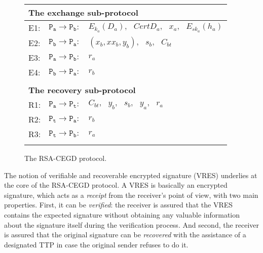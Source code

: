 \documentclass{article}
\begin{document}
\begin{figure}[t]
\begin{center}
\begin{tabular}[3]{lll}


\hline

\hline

\multicolumn{3}{l}{\textbf{The exchange sub-protocol}}\\

\hline

E1: & $\mathtt{P_a} \rightarrow \mathtt{P_b}:$ & $E_{k_a}(D_a),
\mbox{ } CertD_a, \mbox{ } x_a, \mbox{ } E_{sk_a}(h_a)$ \\

E2: & $\mathtt{P_b} \rightarrow \mathtt{P_a}:$ & $(x_b, xx_b,
y_b),
\mbox{ } s_b, \mbox{ } C_{bt}$ \\

E3: & $\mathtt{P_a} \rightarrow \mathtt{P_b}:$ & $r_a$ \\

E4: & $\mathtt{P_b} \rightarrow \mathtt{P_a}:$ & $r_b$ \\

\hline

\hline

\\

\hline

\hline

\multicolumn{3}{l}{\textbf{The recovery sub-protocol}}\\

\hline

R1: & $\mathtt{P_a} \rightarrow \mathtt{P_t}:$ & $C_{bt},
\mbox{ } y_b, \mbox{ } s_b, \mbox{ } y_a, \mbox{ } r_a$ \\

R2: & $\mathtt{P_t} \rightarrow \mathtt{P_a}:$ & $r_b$ \\

R3: & $\mathtt{P_t} \rightarrow \mathtt{P_b}:$ & $r_a$ \\

& & \\

\hline

\hline
\end{tabular}
\end{center}
\caption{The RSA-CEGD protocol.}\label{Fig:RSA-CEGD}
\end{figure}



The notion of verifiable and recoverable encrypted signature (VRES)
underlies at the core of the RSA-CEGD protocol. A VRES is basically
an encrypted signature, which acts as a \emph{receipt} from the
receiver's point of view, with two main properties. First, it can be
\emph{verified}: the receiver is assured that the VRES contains the
expected signature without obtaining any valuable information about
the signature itself during the verification process. And second,
the receiver is assured that the original signature can be
\emph{recovered} with the assistance of a designated TTP in case the
original sender refuses to do it.
\end{document}

